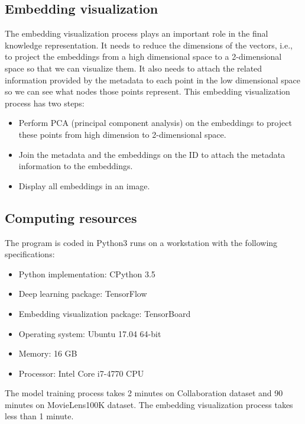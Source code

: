 \documentclass[conference]{IEEEtran}
\begin{document}
\subsection{Embedding visualization}
The embedding visualization process plays an important role in the final knowledge representation. It needs to reduce the dimensions of the vectors, i.e., to project the embeddings from a high dimensional space to a 2-dimensional space so that we can visualize them.
It also needs to attach the related information provided by the metadata to each point in the low dimensional space so we can see what nodes those points represent.
This embedding visualization process has two steps:
\begin{itemize}
	\item Perform PCA (principal component analysis) on the embeddings to project these points from high dimension to 2-dimensional space.
	\item Join the metadata and the embeddings on the ID to attach the metadata information to the embeddings.
	\item Display all embeddings in an image.
\end{itemize}

\subsection{Computing resources}
The program is coded in Python3 runs on a workstation with the following specifications:
\begin{itemize}
	\item Python implementation: CPython 3.5
	\item Deep learning package: TensorFlow \cite{abadi2016tensorflow}
	\item Embedding visualization package: TensorBoard \cite{abadi2016tensorflow}
	\item Operating system: Ubuntu 17.04 64-bit
	\item Memory: 16 GB
	\item Processor: Intel Core i7-4770 CPU
\end{itemize}
The model training process takes 2 minutes on Collaboration dataset and 90 minutes on MovieLens100K dataset. The embedding visualization process takes less than 1 minute.
\end{document}
